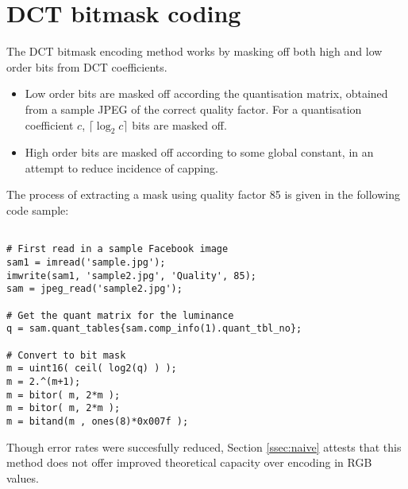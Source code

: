 \chapter{DCT bitmask coding}
\label{app:dct}

The DCT bitmask encoding method works by masking off both high and low order bits from DCT coefficients.

\begin{itemize}

    \item Low order bits are masked off according the quantisation matrix, obtained from a sample JPEG of the correct quality factor. For a quantisation coefficient $c$, $\lceil \log_2{c} \rceil$ bits are masked off.
    
    \item High order bits are masked off according to some global constant, in an attempt to reduce incidence of capping. 

\end{itemize}

The process of extracting a mask using quality factor 85 is given in the following code sample:

\FloatBarrier
    \begin{lstlisting}[label=code:auth,caption=DCT bitmask method,float=h]
    
# First read in a sample Facebook image
sam1 = imread('sample.jpg');
imwrite(sam1, 'sample2.jpg', 'Quality', 85);
sam = jpeg_read('sample2.jpg');

# Get the quant matrix for the luminance
q = sam.quant_tables{sam.comp_info(1).quant_tbl_no};

# Convert to bit mask
m = uint16( ceil( log2(q) ) );
m = 2.^(m+1);
m = bitor( m, 2*m );
m = bitor( m, 2*m );
m = bitand(m , ones(8)*0x007f );
\end{lstlisting}
\FloatBarrier


Though error rates were succesfully reduced, Section \ref{ssec:naive} attests that this method does not offer improved theoretical capacity over encoding in RGB values.